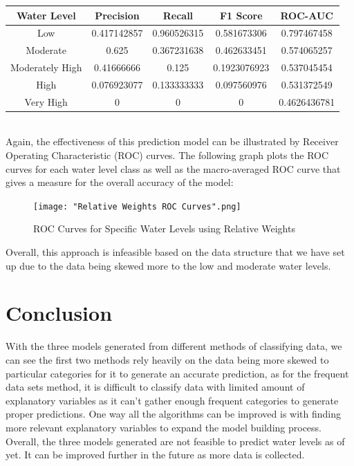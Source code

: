 \documentclass[10pt, conference, compsocconf]{IEEEtran}
\begin{document}
\begin{center}
\begin{tabular}{ |c|c|c|c|c| } 
 \hline
 Water Level & Precision & Recall & F1 Score & ROC-AUC \\ 
 \hline
 Low & 0.417142857 & 0.960526315 &  0.581673306 & 0.797467458 \\
 \hline
 Moderate & 0.625 & 0.367231638 & 0.462633451 & 0.574065257 \\
 \hline
 Moderately High & 0.41666666 & 0.125 & 0.1923076923 & 0.537045454 \\ 
 \hline
 High & 0.076923077 & 0.133333333 & 0.097560976 & 0.531372549 \\ 
 \hline
 Very High & 0 & 0 & 0 & 0.4626436781 \\ 
 \hline
\end{tabular}
\end{center}\\

Again, the effectiveness of this prediction model can be illustrated by Receiver Operating Characteristic (ROC) curves. The following graph plots the ROC curves for each water level class as well as the macro-averaged ROC curve that gives a measure for the overall accuracy of the model:

\begin{figure}[H]
\texttt{[image: "Relative Weights ROC Curves".png]}
\centering
\caption{ROC Curves for Specific Water Levels using Relative Weights}
\end{figure}

Overall, this approach is infeasible based on the data structure that we have set up due to the data being skewed more to the low and moderate water levels. 

\section{Conclusion}
With the three models generated from different methods of classifying data, we can see the first two methods rely heavily on the data being more skewed to particular categories for it to generate an accurate prediction, as for the frequent data sets method, it is difficult to classify data with limited amount of explanatory variables as it can't gather enough frequent categories to generate proper predictions. One way all the algorithms can be improved is with finding more relevant explanatory variables to expand the model building process. Overall, the three models generated are not feasible to predict water levels as of yet. It can be improved further in the future as more data is collected.
\end{document}
